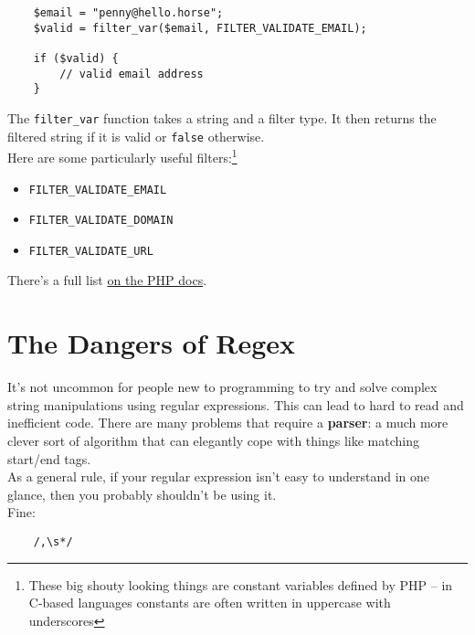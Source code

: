 \begin{verbatim}
    $email = "penny@hello.horse";
    $valid = filter_var($email, FILTER_VALIDATE_EMAIL);

    if ($valid) {
        // valid email address
    }
\end{verbatim}

The \texttt{filter\_var} function takes a string and a filter type. It then returns the filtered string if it is valid or \texttt{false} otherwise.
\\

Here are some particularly useful filters:\footnote{These big shouty looking things are constant variables defined by PHP – in C-based languages constants are often written in uppercase with underscores}

\begin{itemize}
    \item \texttt{FILTER\_VALIDATE\_EMAIL}
    \item \texttt{FILTER\_VALIDATE\_DOMAIN}
    \item \texttt{FILTER\_VALIDATE\_URL}
\end{itemize}

There's a full list \href{https://www.php.net/manual/en/filter.filters.validate.php}{on the PHP docs}.



\section{The Dangers of Regex}


It's not uncommon for people new to programming to try and solve complex string manipulations using regular expressions. This can lead to hard to read and inefficient code. There are many problems that require a \textbf{parser}: a much more clever sort of algorithm that can elegantly cope with things like matching start/end tags.
\\

As a general rule, if your regular expression isn't easy to understand in one glance, then you probably shouldn't be using it.
\\

Fine:

\begin{verbatim}
    /,\s*/
\end{verbatim}

